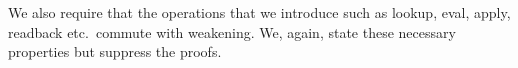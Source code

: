 \documentclass[preliminary,copyright,creativecommons]{eptcs}
\newenvironment{code}{\verbatim}{\endverbatim}
\begin{document}
{\begin{code}
\\
\>   \AgdaSymbol{(} \AgdaSymbol{)} \AgdaSymbol{=}   \AgdaSymbol{(}   \AgdaSymbol{)}\<\\
\>   \AgdaSymbol{(}  \AgdaSymbol{)} \AgdaSymbol{=}  \AgdaSymbol{(} \AgdaSymbol{)} \AgdaSymbol{(}   \AgdaSymbol{)}\<\\
\\
\>   \AgdaSymbol{(} \AgdaSymbol{)} \<[22]\>[22]\AgdaSymbol{=}   \AgdaSymbol{(}   \AgdaSymbol{)}\<\\
\>   \AgdaSymbol{(}  \AgdaSymbol{)} \AgdaSymbol{=}   \AgdaSymbol{(}   \AgdaSymbol{)} \AgdaSymbol{(}   \AgdaSymbol{)}\<\end{code}}

\noindent
We also require that the operations that we introduce such as lookup,
eval, apply, readback etc.\ commute with weakening. We, again, state
these necessary properties but suppress the proofs.
\end{document}
